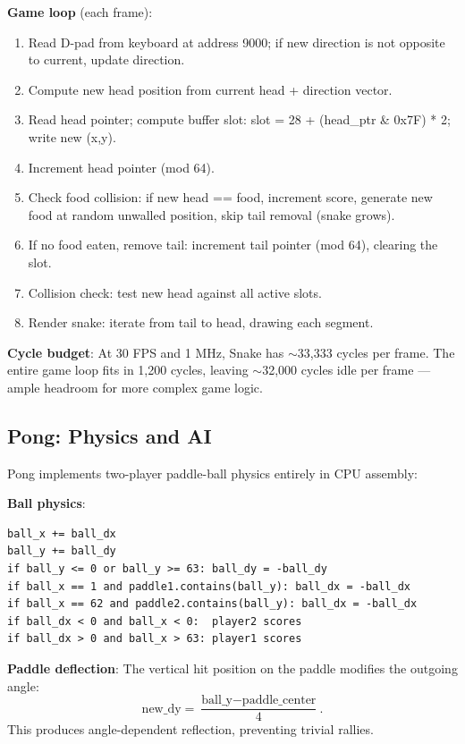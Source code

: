 \documentclass[12pt,a4paper,twoside]{book}
\theoremstyle{trinarytheorem}
\theoremstyle{trinarydefinition}
\newcommand{\code}[1]{\textsf{#1}}
\begin{document}
\noindent\textbf{Game loop} (each frame):
\begin{enumerate}
    \item Read D-pad from keyboard at address 9000; if new direction is
          not opposite to current, update direction.
    \item Compute new head position from current head + direction vector.
    \item Read head pointer; compute buffer slot:
          \code{slot = 28 + (head\_ptr \& 0x7F) * 2}; write new (x,y).
    \item Increment head pointer (mod 64).
    \item Check food collision: if new head == food, increment score,
          generate new food at random unwalled position, skip tail removal
          (snake grows).
    \item If no food eaten, remove tail: increment tail pointer (mod 64),
          clearing the slot.
    \item Collision check: test new head against all active slots.
    \item Render snake: iterate from tail to head, drawing each segment.
\end{enumerate}

\noindent\textbf{Cycle budget}: At 30 FPS and 1 MHz, Snake has $\sim$33,333
cycles per frame. The entire game loop fits in 1,200 cycles, leaving
$\sim$32,000 cycles idle per frame --- ample headroom for more complex
game logic.

\subsection{Pong: Physics and AI}

Pong implements two-player paddle-ball physics entirely in CPU assembly:

\noindent\textbf{Ball physics}:
\begin{verbatim}
ball_x += ball_dx
ball_y += ball_dy
if ball_y <= 0 or ball_y >= 63: ball_dy = -ball_dy
if ball_x == 1 and paddle1.contains(ball_y): ball_dx = -ball_dx
if ball_x == 62 and paddle2.contains(ball_y): ball_dx = -ball_dx
if ball_dx < 0 and ball_x < 0:  player2 scores
if ball_dx > 0 and ball_x > 63: player1 scores
\end{verbatim}

\noindent\textbf{Paddle deflection}: The vertical hit position on the
paddle modifies the outgoing angle:
\[
\text{new\_dy} = \frac{\text{ball\_y} - \text{paddle\_center}}{4}.
\]
This produces angle-dependent reflection, preventing trivial rallies.
\end{document}
